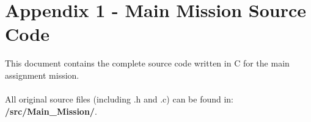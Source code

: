\documentclass[12pt]{article}
\begin{document}
\section*{Appendix 1 - Main Mission Source Code}

This document contains the complete source code written in C for the main assignment mission.\\\\
All original source files (including .h and .c) can be found in: \textbf{/src/Main\_Mission/}.
\end{document}
